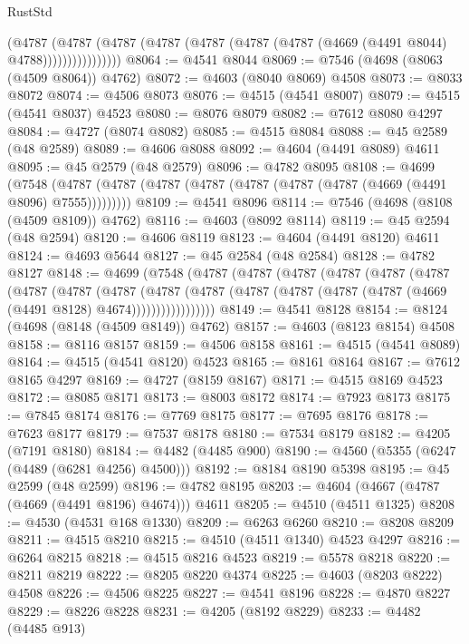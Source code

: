 \begin{lexlean}{RustStd}
\begin{coremodule}
                    (@4787
                      (@4787
                        (@4787
                          (@4787 (@4787 (@4787 (@4787 (@4669 (@4491 @8044) @4788))))))))))))))))
@8064 := @4541 @8044
@8069 := @7546 (@4698 (@8063 (@4509 @8064)) @4762)
@8072 := @4603 (@8040 @8069) @4508
@8073 := @8033 @8072
@8074 := @4506 @8073
@8076 := @4515 (@4541 @8007)
@8079 := @4515 (@4541 @8037) @4523
@8080 := @8076 @8079
@8082 := @7612 @8080 @4297
@8084 := @4727 (@8074 @8082)
@8085 := @4515 @8084
@8088 := @45 @2589 (@48 @2589)
@8089 := @4606 @8088
@8092 := @4604 (@4491 @8089) @4611
@8095 := @45 @2579 (@48 @2579)
@8096 := @4782 @8095
@8108 := @4699
    (@7548 (@4787 (@4787 (@4787 (@4787 (@4787 (@4787 (@4787 (@4669 (@4491 @8096) @7555)))))))))
@8109 := @4541 @8096
@8114 := @7546 (@4698 (@8108 (@4509 @8109)) @4762)
@8116 := @4603 (@8092 @8114)
@8119 := @45 @2594 (@48 @2594)
@8120 := @4606 @8119
@8123 := @4604 (@4491 @8120) @4611
@8124 := @4693 @5644
@8127 := @45 @2584 (@48 @2584)
@8128 := @4782 @8127
@8148 := @4699
    (@7548
      (@4787
        (@4787
          (@4787
            (@4787
              (@4787
                (@4787
                  (@4787
                    (@4787
                      (@4787
                        (@4787
                          (@4787
                            (@4787 (@4787 (@4787 (@4787 (@4669 (@4491 @8128) @4674)))))))))))))))))
@8149 := @4541 @8128
@8154 := @8124 (@4698 (@8148 (@4509 @8149)) @4762)
@8157 := @4603 (@8123 @8154) @4508
@8158 := @8116 @8157
@8159 := @4506 @8158
@8161 := @4515 (@4541 @8089)
@8164 := @4515 (@4541 @8120) @4523
@8165 := @8161 @8164
@8167 := @7612 @8165 @4297
@8169 := @4727 (@8159 @8167)
@8171 := @4515 @8169 @4523
@8172 := @8085 @8171
@8173 := @8003 @8172
@8174 := @7923 @8173
@8175 := @7845 @8174
@8176 := @7769 @8175
@8177 := @7695 @8176
@8178 := @7623 @8177
@8179 := @7537 @8178
@8180 := @7534 @8179
@8182 := @4205 (@7191 @8180)
@8184 := @4482 (@4485 @900)
@8190 := @4560 (@5355 (@6247 (@4489 (@6281 @4256) @4500)))
@8192 := @8184 @8190 @5398
@8195 := @45 @2599 (@48 @2599)
@8196 := @4782 @8195
@8203 := @4604 (@4667 (@4787 (@4669 (@4491 @8196) @4674))) @4611
@8205 := @4510 (@4511 @1325)
@8208 := @4530 (@4531 @168 @1330)
@8209 := @6263 @6260
@8210 := @8208 @8209
@8211 := @4515 @8210
@8215 := @4510 (@4511 @1340) @4523 @4297
@8216 := @6264 @8215
@8218 := @4515 @8216 @4523
@8219 := @5578 @8218
@8220 := @8211 @8219
@8222 := @8205 @8220 @4374
@8225 := @4603 (@8203 @8222) @4508
@8226 := @4506 @8225
@8227 := @4541 @8196
@8228 := @4870 @8227
@8229 := @8226 @8228
@8231 := @4205 (@8192 @8229)
@8233 := @4482 (@4485 @913)

\end{coremodule}
\end{lexlean}

